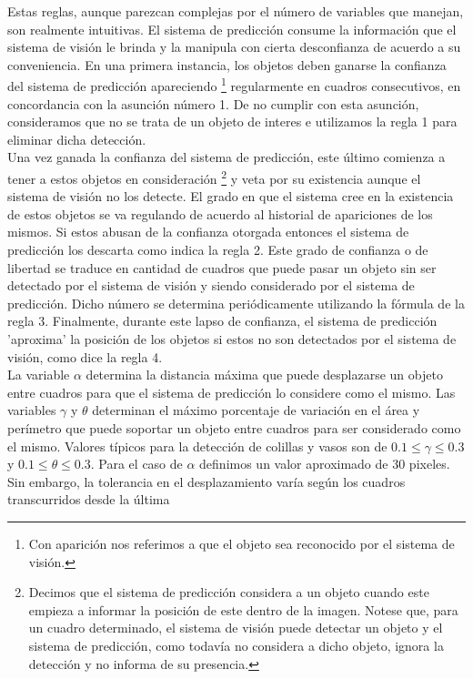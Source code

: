 Estas reglas, aunque parezcan complejas por el número de variables que 
manejan, son realmente intuitivas. El sistema de predicción consume la 
información que el sistema de visión le brinda y la manipula con 
cierta desconfianza de acuerdo a su 
conveniencia. En una primera instancia, los objetos deben ganarse la 
confianza del sistema de predicción apareciendo \footnote{Con 
aparición nos referimos a que el objeto sea reconocido por el sistema 
de visión.} regularmente en 
cuadros consecutivos, en concordancia con la asunción número 
1. De no cumplir con esta asunción, consideramos que no se trata de un 
objeto de interes e utilizamos la regla 1 para eliminar dicha detección. \\
	Una vez ganada la confianza del sistema de predicción, este 
	último comienza a tener a estos objetos en consideración 
	\footnote{Decimos que el sistema de predicción considera a un 
	objeto cuando este empieza a informar la posición de este dentro de la 
	imagen. Notese que, para un cuadro determinado, el sistema de 
	visión puede detectar un objeto y el sistema de predicción, como 
	todavía no considera a dicho objeto, ignora la detección y no informa de su 
	presencia.} y veta por su 
existencia aunque el sistema de visión no los detecte. El grado en que 
el sistema cree en la existencia de estos objetos se va regulando de 
acuerdo al historial de apariciones de los mismos. Si estos abusan de 
la confianza otorgada entonces el sistema de predicción los descarta 
como indica la regla 2. 
Este grado de confianza o de libertad se traduce en cantidad de 
cuadros que puede pasar un objeto sin ser detectado por el sistema de 
visión y siendo considerado por el sistema de predicción. Dicho 
número se determina periódicamente utilizando la fórmula de la regla 3.
Finalmente, durante este lapso de confianza, el sistema de predicción 
'aproxima' la posición de los objetos si estos no son detectados por el 
sistema de visión, como dice la regla 4. \\
\indent La variable $\alpha$ determina la distancia máxima que puede 
desplazarse un objeto entre cuadros para que el sistema de predicción lo considere 
como el mismo. Las variables $\gamma$ y $\theta$ determinan el máximo 
porcentaje de variación en el área y perímetro que puede soportar un 
objeto entre cuadros para ser considerado como el mismo. Valores 
típicos para la detección de colillas y vasos son de 
$0.1\leq\gamma\leq0.3$ y $0.1\leq\theta\leq0.3$. Para el caso de 
$\alpha$ definimos un valor aproximado de 30 pixeles. Sin embargo, la 
tolerancia en el desplazamiento varía según los cuadros transcurridos desde la última 

